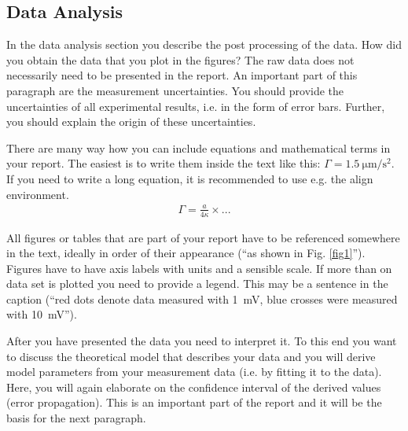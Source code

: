 \subsection{Data Analysis}

In the data analysis section you describe the post processing of the
data. How did you obtain the data that you plot in the figures? The raw data does not necessarily need
to be presented in the report. An important part of this paragraph
are the measurement uncertainties. You should provide the
uncertainties of all experimental results, i.e. in the form of error
bars. Further, you should explain the origin of these uncertainties.

There are many way how you can include equations and mathematical terms in your report. The easiest is to write them inside the text like this: $\Gamma =\SI{1.5}{\micro\meter\per\square\second}$. If you need to write a long equation, it is recommended to use e.g. the align environment.
\begin{align}
    \Gamma = \frac{a}{4\kappa}\times ...
\end{align}

All figures or tables that are part of your report have to be
referenced somewhere in the text, ideally in order of their
appearance (``as shown in Fig. \ref{fig1}''). Figures have to
have axis labels with units and a sensible scale. If more than on
data set is plotted you need to provide a legend. This may be a sentence in the caption (``red dots denote data measured with \SI{1}{\milli\volt}, blue crosses were measured with \SI{10}{\milli\volt}'').

After you have presented the data you need to interpret it. To this
end you want to discuss the theoretical model that describes your
data and you will derive model parameters from your measurement data
(i.e. by fitting it to the data). Here, you will again elaborate on
the confidence interval of the derived values (error propagation).
This is an important part of the report and it will be the basis for
the next paragraph.